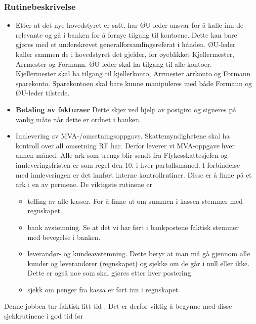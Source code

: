 \subsubsection{Rutinebeskrivelse}

\begin{itemize}

\item{} Etter at det nye hovedstyret er satt, har ØU-leder ansvar for å kalle inn de
  relevante og gå i banken for å fornye tilgang til kontoene. Dette
  kan bare gjøres med et underskrevet generalforsamlingsreferat i
  hånden. ØU-leder kaller sammen de i hovedstyret det gjelder, for
  øyeblikket Kjellermester, Arrmester og Formann. ØU-leder skal ha
  tilgang til alle kontoer. Kjellermester skal ha tilgang til
  kjellerkonto, Arrmester arrkonto og Formann sparekonto. Sparekontoen
  skal bare kunne manipuleres med både Formann og ØU-leder tilstede.

\item{} \textbf{Betaling av fakturaer} Dette skjer ved hjelp av
  postgiro og signeres på vanlig måte når dette er ordnet i banken.

\item{} Innlevering av MVA-/omsetningsoppgave. Skattemyndighetene skal ha kontroll
  over all omsetning RF har. Derfor leverer vi MVA-oppgave hver annen
  måned. Alle ark som trengs blir sendt fra Flykesskattesjefen og
  innleveringsfristen er som regel den 10. i hver partallsmåned. I
  forbindelse med innleveringen er det innført interne
  kontrollrutiner. Disse er å finne på et ark i en av
  permene. De viktigste rutinene er
  \begin{itemize}
  \item{}telling av alle kasser. For å finne ut om summen i kassen
    stemmer med regnskapet.
  \item{}bank avstemning. Se at det vi har ført i bankpostene faktisk
    stemmer med bevegelse i banken.
  \item{}leverandør- og kundeavstemning. Dette betyr at man må gå
    gjennom alle kunder og leverandører (regnskapet) og sjekke om de går i null
    eller ikke. Dette er også noe som skal gjøres etter hver
    postering.
  \item{}sjekk om penger fra kassa er ført inn i regnskapet.
  \end{itemize}
\end{itemize}
Denne jobben tar faktisk litt tid . Det er derfor viktig
å begynne med disse sjekkrutinene i god tid før
